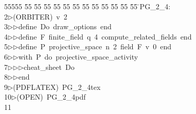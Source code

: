 %
%
\begin{tabbing}
55555 \= 55 \= 55 \= 55 \= 55 \= 55 \= 55 \= 55 \= 55 \= 55 \= 55 \= 55 \= 55 \= \>PG\_2\_4:\\[0pt]
2\>$\triangleright$\>(ORBITER)\ v\ 2\ \\[0pt]
3\>$\triangleright$\>$\triangleright$\>define\ Do\ draw\_options\ end\ \\[0pt]
4\>$\triangleright$\>$\triangleright$\>define\ F\ finite\_field\ q\ 4\ compute\_related\_fields\ end\ \\[0pt]
5\>$\triangleright$\>$\triangleright$\>define\ P\ projective\_space\ n\ 2\ field\ F\ v\ 0\ end\ \\[0pt]
6\>$\triangleright$\>$\triangleright$\>with\ P\ do\ projective\_space\_activity\ \\[0pt]
7\>$\triangleright$\>$\triangleright$\>$\triangleright$\>cheat\_sheet\ Do\ \\[0pt]
8\>$\triangleright$\>$\triangleright$\>end\\[0pt]
9\>$\triangleright$\>(PDFLATEX)\ PG\_2\_4tex\ \\[0pt]
10\>$\triangleright$\>(OPEN)\ PG\_2\_4pdf\\[0pt]
11\>\end{tabbing}
